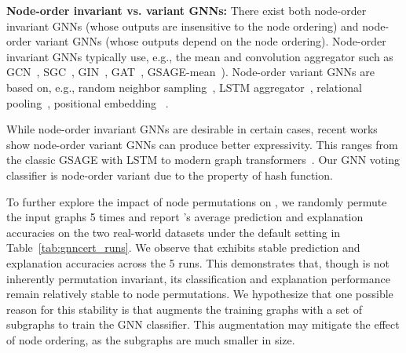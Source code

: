 {\bf Node-order invariant vs. variant GNNs:} There exist both node-order invariant GNNs  (whose outputs are insensitive to the node ordering) and node-order variant GNNs  (whose outputs depend on the node ordering). Node-order invariant GNNs typically use, e.g., the mean and convolution aggregator such as  GCN~\citep{kipf2017semi}, SGC~\citep{wu2019simplifying}, GIN~\citep{xu2018powerful}, GAT~\citep{velivckovic2018graph}, GSAGE-mean~\citep{hamilton2017inductive}). 
Node-order variant GNNs are based on, e.g., random neighbor sampling~\citep{papp2021dropgnn,Rong2020DropEdge,Zeng2020GraphSAINT}, LSTM aggregator~\citep{hamilton2017inductive}, relational pooling~\citep{murphy2019relational}, positional embedding ~\citep{dwivedi2022graph,kreuzer2021rethinking,zhu2023hierarchical}. 

While node-order invariant GNNs are desirable in certain cases, recent works ~\citep{Loukas2020What,papp2021dropgnn,huang2022going} show node-order variant GNNs can produce better expressivity. This ranges from the classic GSAGE with LSTM to modern graph transformers~\citep{kreuzer2021rethinking,zhu2023hierarchical}. Our GNN voting classifier is node-order variant due to the property of hash function.  

{To further explore the impact of node permutations on {\name}, we randomly permute the input graphs 5 times and report {\name}'s average prediction and explanation accuracies on the two real-world datasets under the default setting in Table~\ref{tab:gnncert_runs}.  
We observe that {\name} exhibits stable prediction and explanation accuracies across the 5 runs. This demonstrates that, though {\name} is not inherently permutation invariant, its classification and explanation performance remain relatively stable to node permutations. 
We hypothesize that one possible reason for this stability is that {\name} augments the training graphs with a set of subgraphs to train the GNN classifier. This augmentation may mitigate the effect of node ordering, as the subgraphs are much smaller in size.}


